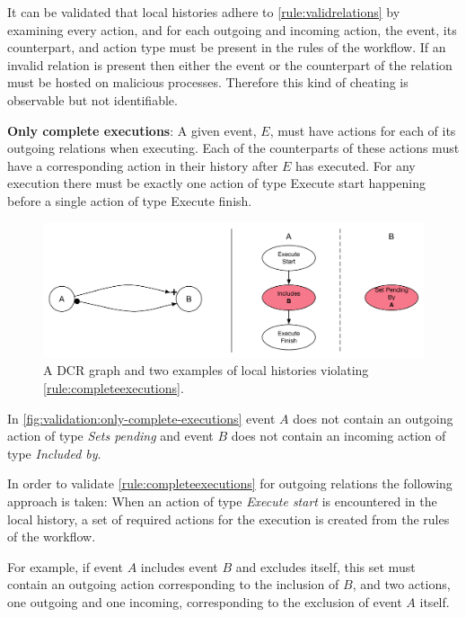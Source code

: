 	\noindent It can be validated that local histories adhere to \autoref{rule:validrelations} by examining every action, and for each outgoing and incoming action, the event, its counterpart, and action type must be present in the rules of the workflow. If an invalid relation is present then either the event or the counterpart of the relation must be hosted on malicious processes. Therefore this kind of cheating is observable but not identifiable.
	
	\begin{ruledef}
		\textbf{Only complete executions}: A given event, $E$, must have actions for each of its outgoing relations when executing. Each of the counterparts of these actions must have a corresponding action in their history after $E$ has executed. For any execution there must be exactly one action of type \textup{Execute start} happening before a single action of type \textup{Execute finish}.
		\label{rule:completeexecutions}
	\end{ruledef}

	\begin{figure}[H]
		\centering
		\includegraphics[width=\textwidth]{6validation/images/only-complete-executions.pdf}
		\caption{A DCR graph and two examples of local histories violating \autoref{rule:completeexecutions}.}
		\label{fig:validation:only-complete-executions}
	\end{figure}

	\noindent In \autoref{fig:validation:only-complete-executions} event $A$ does not contain an outgoing action of type \textit{Sets pending} and event $B$ does not contain an incoming action of type \textit{Included by}.

	\newpar In order to validate \autoref{rule:completeexecutions} for outgoing relations the following approach is taken: When an action of type \textit{Execute start} is encountered in the local history, a set of required actions for the execution is created from the rules of the workflow.
	
	For example, if event $A$ includes event $B$ and excludes itself, this set must contain an outgoing action corresponding to the inclusion of $B$, and two actions, one outgoing and one incoming, corresponding to the exclusion of event $A$ itself.
	
